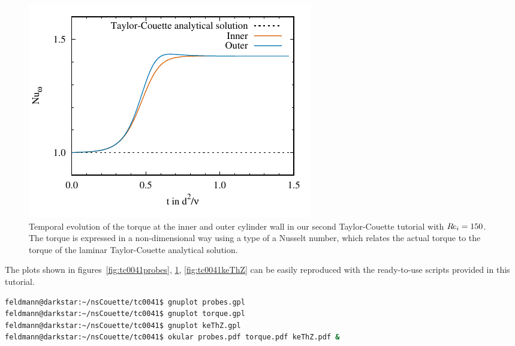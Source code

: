 \documentclass[a4paper, 11pt, DIV=11]{scrartcl}
\begin{document}
\begin{figure}[htb]
\centering
\includegraphics[scale=1.0, trim=0mm 0mm 0mm 0mm, clip=true]{figures/tc0041/torque}
\caption{Temporal evolution of the torque at the inner and outer cylinder
wall in our second Taylor-Couette tutorial  with $R\hspace{-0.1em}e_{i}=\num{150}$.
The torque is expressed in a non-dimensional way using a type of a Nusselt
number, which relates the actual torque to the torque of the laminar
Taylor-Couette analytical solution.}
\label{fig:tc0041torque}
\end{figure}
The plots shown in figures~\ref{fig:tc0041probes}, \ref{fig:tc0041torque},
\ref{fig:tc0041keThZ} can be easily reproduced with the ready-to-use
\gnuplot scripts provided in this tutorial.
\begin{lstlisting}[language=bash]
feldmann@darkstar:~/nsCouette/tc0041$ gnuplot probes.gpl
feldmann@darkstar:~/nsCouette/tc0041$ gnuplot torque.gpl
feldmann@darkstar:~/nsCouette/tc0041$ gnuplot keThZ.gpl
feldmann@darkstar:~/nsCouette/tc0041$ okular probes.pdf torque.pdf keThZ.pdf &
\end{lstlisting}
\end{document}

